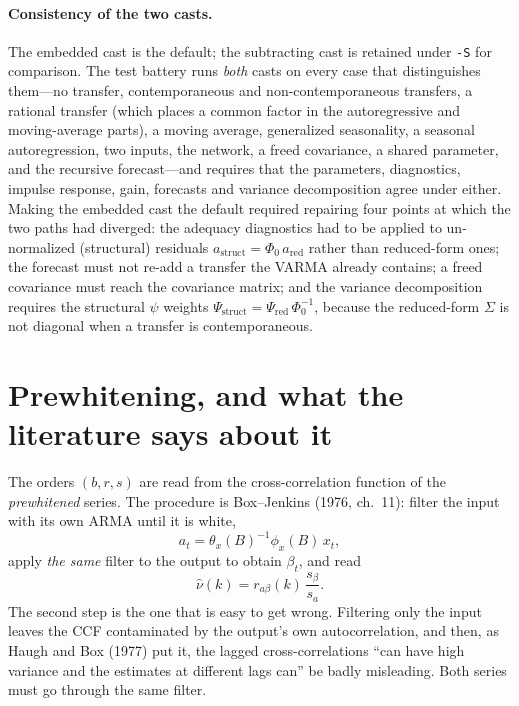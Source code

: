 \documentclass[11pt,a4paper]{article}
\theoremstyle{plain}
\theoremstyle{remark}
\begin{document}
\paragraph{Consistency of the two casts.} The embedded cast is the default; the
subtracting cast is retained under \texttt{-S} for comparison. The test battery
runs \emph{both} casts on every case that distinguishes them---no transfer,
contemporaneous and non-contemporaneous transfers, a rational transfer (which
places a common factor in the autoregressive and moving-average parts), a moving
average, generalized seasonality, a seasonal autoregression, two inputs, the
network, a freed covariance, a shared parameter, and the recursive forecast---and
requires that the parameters, diagnostics, impulse response, gain, forecasts and
variance decomposition agree under either. Making the embedded cast the default
required repairing four points at which the two paths had diverged: the adequacy
diagnostics had to be applied to un-normalized (structural) residuals
$a_{\text{struct}}=\Phi_0\,a_{\text{red}}$ rather than reduced-form ones; the
forecast must not re-add a transfer the VARMA already contains; a freed covariance
must reach the covariance matrix; and the variance decomposition requires the
structural $\psi$ weights $\Psi_{\text{struct}}=\Psi_{\text{red}}\,\Phi_0^{-1}$,
because the reduced-form $\Sigma$ is not diagonal when a transfer is
contemporaneous.

\section{Prewhitening, and what the literature says about it}
\label{sec:prewhitening}

The orders $(b,r,s)$ are read from the cross-correlation function of the
\emph{prewhitened} series. The procedure is Box--Jenkins (1976, ch.~11): filter
the input with its own ARMA until it is white,
\begin{equation}
 a_t = \theta_x(B)^{-1}\phi_x(B)\,x_t ,
 \label{eq:prewhiten}
\end{equation}
apply \emph{the same} filter to the output to obtain $\beta_t$, and read
\begin{equation}
 \hat\nu(k) = r_{a\beta}(k)\,\frac{s_\beta}{s_a}.
 \label{eq:nuhat}
\end{equation}
The second step is the one that is easy to get wrong. Filtering only the input
leaves the CCF contaminated by the output's own autocorrelation, and then, as
Haugh and Box (1977) put it, the lagged cross-correlations ``can have high
variance and the estimates at different lags can'' be badly misleading. Both
series must go through the same filter.
\end{document}
